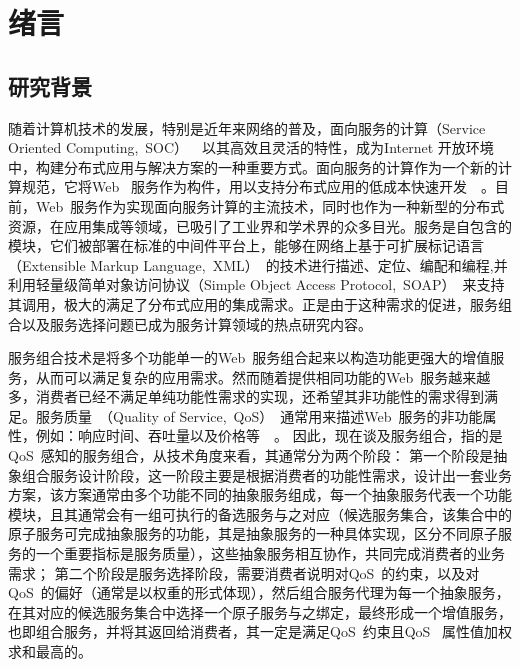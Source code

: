 \chapter{绪言}

\section{研究背景}



随着计算机技术的发展，特别是近年来网络的普及，面向服务的计算（Service Oriented Computing,~SOC）~\cite{papazoglou2003service,papazoglou2008service,zhang2007services}~以其高效且灵活的特性，成为Internet 开放环境中，构建分布式应用与解决方案的一种重要方式。面向服务的计算作为一个新的计算规范，它将Web~ 服务作为构件，用以支持分布式应用的低成本快速开发~\cite{papazoglou2008web}~。目前，Web~服务作为实现面向服务计算的主流技术，同时也作为一种新型的分布式资源，在应用集成等领域，已吸引了工业界和学术界的众多目光。服务是自包含的模块，它们被部署在标准的中间件平台上，能够在网络上基于可扩展标记语言（Extensible Markup Language,~XML）~的技术进行描述、定位、编配和编程,并利用轻量级简单对象访问协议（Simple Object Access Protocol,~SOAP）~来支持其调用，极大的满足了分布式应用的集成需求。正是由于这种需求的促进，服务组合以及服务选择问题已成为服务计算领域的热点研究内容。

服务组合技术是将多个功能单一的Web~服务组合起来以构造功能更强大的增值服务，从而可以满足复杂的应用需求。然而随着提供相同功能的Web~服务越来越多，消费者已经不满足单纯功能性需求的实现，还希望其非功能性的需求得到满足。服务质量~（Quality of Service,~QoS）~通常用来描述Web~服务的非功能属性，例如：响应时间、吞吐量以及价格等~\cite{zeng2003quality,zeng2004qos}~。
因此，现在谈及服务组合，指的是QoS~感知的服务组合，从技术角度来看，其通常分为两个阶段：
第一个阶段是抽象组合服务设计阶段，这一阶段主要是根据消费者的功能性需求，设计出一套业务方案，该方案通常由多个功能不同的抽象服务组成，每一个抽象服务代表一个功能模块，且其通常会有一组可执行的备选服务与之对应（候选服务集合，该集合中的原子服务可完成抽象服务的功能，其是抽象服务的一种具体实现，区分不同原子服务的一个重要指标是服务质量），这些抽象服务相互协作，共同完成消费者的业务需求；
第二个阶段是服务选择阶段，需要消费者说明对QoS~的约束，以及对QoS~的偏好（通常是以权重的形式体现），然后组合服务代理为每一个抽象服务，在其对应的候选服务集合中选择一个原子服务与之绑定，最终形成一个增值服务，也即组合服务，并将其返回给消费者，其一定是满足QoS~约束且QoS~ 属性值加权求和最高的。


